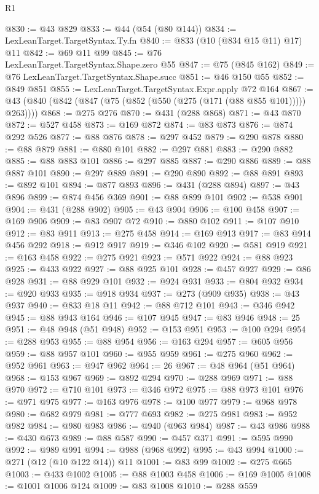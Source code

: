 \begin{lexlean}{R1}
\begin{coremodule}
@830 := @43 @829
@833 := @44 (@54 (@80 @144))
@834 := LexLeanTarget.TargetSyntax.Ty.fn
@840 := @833 (@10 (@834 @15 @11) @17) @11
@842 := @69 @11 @99
@845 := @76 LexLeanTarget.TargetSyntax.Shape.zero @55
@847 := @75 (@845 @162)
@849 := @76 LexLeanTarget.TargetSyntax.Shape.succ
@851 := @46 @150 @55
@852 := @849 @851
@855 := LexLeanTarget.TargetSyntax.Expr.apply @72 @164
@867 := @43 (@840 (@842 (@847 (@75 (@852 (@550 (@275 (@171 (@88 @855 @101))))) @263))))
@868 := @275 @276
@870 := @431 (@288 @868)
@871 := @43 @870
@872 := @527 @458
@873 := @169 @872
@874 := @83 @873
@876 := @874 @292 @526
@877 := @88 @876
@878 := @297 @452
@879 := @290 @878
@880 := @88 @879
@881 := @880 @101
@882 := @297 @881
@883 := @290 @882
@885 := @88 @883 @101
@886 := @297 @885
@887 := @290 @886
@889 := @88 @887 @101
@890 := @297 @889
@891 := @290 @890
@892 := @88 @891
@893 := @892 @101
@894 := @877 @893
@896 := @431 (@288 @894)
@897 := @43 @896
@899 := @874 @456 @369
@901 := @88 @899 @101
@902 := @538 @901
@904 := @431 (@288 @902)
@905 := @43 @904
@906 := @100 @458
@907 := @169 @906
@909 := @83 @907 @72
@910 := @880 @102
@911 := @107 @910
@912 := @83 @911
@913 := @275 @458
@914 := @169 @913
@917 := @83 @914 @456 @292
@918 := @912 @917
@919 := @346 @102
@920 := @581 @919
@921 := @163 @458
@922 := @275 @921
@923 := @571 @922
@924 := @88 @923
@925 := @433 @922
@927 := @88 @925 @101
@928 := @457 @927
@929 := @86 @928
@931 := @88 @929 @101
@932 := @924 @931
@933 := @804 @932
@934 := @920 @933
@935 := @918 @934
@937 := @273 (@909 @935)
@938 := @43 @937
@940 := @833 @18 @11
@942 := @88 @712 @101
@943 := @346 @942
@945 := @88 @943 @164
@946 := @107 @945
@947 := @83 @946
@948 := 25
@951 := @48 @948 (@51 @948)
@952 := @153 @951
@953 := @100 @294
@954 := @288 @953
@955 := @88 @954
@956 := @163 @294
@957 := @605 @956
@959 := @88 @957 @101
@960 := @955 @959
@961 := @275 @960
@962 := @952 @961
@963 := @947 @962
@964 := 26
@967 := @48 @964 (@51 @964)
@968 := @153 @967
@969 := @892 @294
@970 := @288 @969
@971 := @88 @970
@972 := @710 @101
@973 := @346 @972
@975 := @88 @973 @101
@976 := @971 @975
@977 := @163 @976
@978 := @100 @977
@979 := @968 @978
@980 := @682 @979
@981 := @777 @693
@982 := @275 @981
@983 := @952 @982
@984 := @980 @983
@986 := @940 (@963 @984)
@987 := @43 @986
@988 := @430 @673
@989 := @88 @587
@990 := @457 @371
@991 := @595 @990
@992 := @989 @991
@994 := @988 (@968 @992)
@995 := @43 @994
@1000 := @271 (@12 (@10 @122 @14)) @11
@1001 := @83 @99
@1002 := @275 @665
@1003 := @433 @1002
@1005 := @88 @1003 @458
@1006 := @169 @1005
@1008 := @1001 @1006 @124
@1009 := @83 @1008
@1010 := @288 @559

\end{coremodule}
\end{lexlean}
